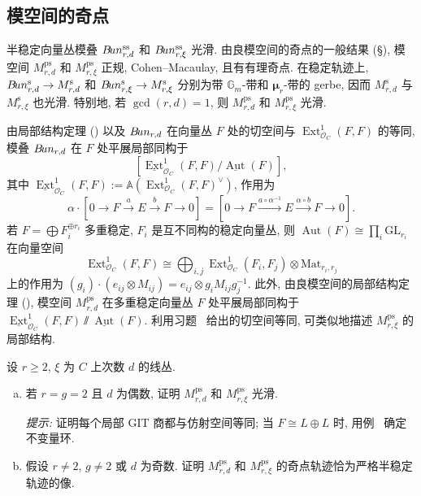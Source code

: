 \subsection{模空间的奇点}\label{src:9.4.2-subsection}
半稳定向量丛模叠 $B\!un_{r,d}^{\mathrm{ss}}$ 和 $B\!un_{r,\xi}^{\mathrm{ss}}$ 光滑. 由良模空间的奇点的一般结果 (\S{}), 模空间 $M_{r,d}^{\mathrm{ps}}$ 和 $M_{r,\xi}^{\mathrm{ps}}$ 正规, Cohen--Macaulay, 且有有理奇点. 在稳定轨迹上, $B\!un_{r,d}^{\mathrm s}\to M_{r,d}^{\mathrm s}$ 和 $B\!un_{r,\xi}^{\mathrm s}\to M_{r,\xi}^{\mathrm s}$ 分别为带 $\mathbb G_m$-带和 $\boldsymbol\mu_r$-带的 gerbe, 因而 $M_{r,d}^{\mathrm s}$ 与 $M_{r,\xi}^{\mathrm s}$ 也光滑. 特别地, 若 $\gcd(r,d)=1$, 则 $M_{r,d}^{\mathrm{ps}}$ 和 $M_{r,\xi}^{\mathrm{ps}}$ 光滑.

由局部结构定理 () 以及 $B\!un_{r,d}$ 在向量丛 $F$ 处的切空间与 $\operatorname{Ext}_{\mathcal O_C}^1(F,F)$ 的等同, 模叠 $B\!un_{r,d}$ 在 $F$ 处平展局部同构于
\[
[\underline{\operatorname{Ext}}_{\mathcal O_C}^1(F,F)/\underline{\operatorname{Aut}}(F)],
\]
其中 $\underline{\operatorname{Ext}}_{\mathcal O_C}^1(F,F):=\mathbb A(\operatorname{Ext}_{\mathcal O_C}^1(F,F)^\vee)$, 作用为
\[
\alpha\cdot[0\to F\xrightarrow aE\xrightarrow bF\to0]
=[0\to F\xrightarrow{a\circ\alpha^{-1}}E\xrightarrow{\alpha\circ b}F\to0].
\]
若 $F=\bigoplus F_i^{\oplus r_i}$ 多重稳定, $F_i$ 是互不同构的稳定向量丛, 则 $\operatorname{Aut}(F)\cong\prod_i\mathrm{GL}_{r_i}$ 在向量空间
\[
\operatorname{Ext}_{\mathcal O_C}^1(F,F)\cong
\bigoplus_{i,j}\operatorname{Ext}_{\mathcal O_C}^1(F_i,F_j)\otimes\mathrm{Mat}_{r_i,r_j}
\]
上的作用为 $(g_i)\cdot(e_{ij}\otimes M_{ij})=e_{ij}\otimes g_iM_{ij}g_j^{-1}$. 此外, 由良模空间的局部结构定理 (), 模空间 $M_{r,d}^{\mathrm{ps}}$ 在多重稳定向量丛 $F$ 处平展局部同构于 $\underline{\operatorname{Ext}}_{\mathcal O_C}^1(F,F)\sslash\underline{\operatorname{Aut}}(F)$. 利用习题~ 给出的切空间等同, 可类似地描述 $M_{r,\xi}^{\mathrm{ps}}$ 的局部结构.
\begin{exercise}\label{src:9.4.10}
设 $r\geq2$, $\xi$ 为 $C$ 上次数 $d$ 的线丛.
\begin{enumerate}[(a)]
\item 若 $r=g=2$ 且 $d$ 为偶数, 证明 $M_{r,d}^{\mathrm{ps}}$ 和 $M_{r,\xi}^{\mathrm{ps}}$ 光滑.

\textit{提示:} 证明每个局部 GIT 商都与仿射空间等同; 当 $F\cong L\oplus L$ 时, 用例~ 确定不变量环.
\item 假设 $r\ne2$, $g\ne2$ 或 $d$ 为奇数. 证明 $M_{r,d}^{\mathrm{ps}}$ 和 $M_{r,\xi}^{\mathrm{ps}}$ 的奇点轨迹恰为严格半稳定轨迹的像.
\end{enumerate}
\end{exercise}
